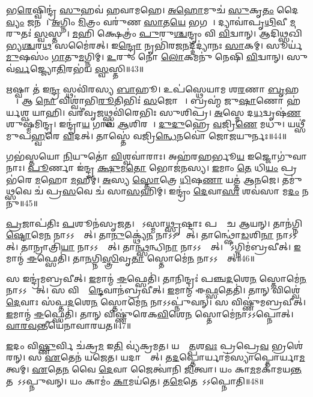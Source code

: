 𑌭\ul{𑌰𑍇}𑌷𑍍𑌵𑌿𑌨𑍍𑌦𑍍𑌰॑ \ul{𑌸𑍁}𑌹𑌵॑ 𑌹𑌵𑌾𑌮𑌹𑍇।
\ul{𑌅}\ul{}\ul{𑌹𑍋}𑌮𑍁𑌚॑ \ul{𑌸𑍁}𑌕𑍃\ul{𑌤𑌂} 𑌦𑍈\ul{𑌵𑍍𑌯𑌂} 𑌜𑌨𑌮𑍍᳚।
\ul{𑌅}𑌗𑍍𑌨𑌿𑌂 \ul{𑌮𑌿}𑌤𑍍𑌰𑌂 𑌵𑌰𑍁॑𑌣 \ul{𑌸𑌾}𑌤\ul{𑌯𑍇} 𑌭𑌗𑌮𑍍᳚।
𑌦𑍍𑌯𑌾𑌵𑌾॑𑌪𑍃\ul{𑌥𑌿}𑌵𑍀 \ul{𑌮}𑌰𑍁𑌤𑌃॑ \ul{𑌸𑍍𑌵}𑌸𑍍𑌤𑌯𑍇᳚।
\ul{𑌮}𑌹𑌿 𑌕𑍍𑌷𑍇𑌤𑍍𑌰𑌂॑ \ul{𑌪𑍁}𑌰𑍁\ul{𑌶𑍍𑌚}𑌨𑍍𑌦𑍍𑌰𑌂 𑌵𑌿 \ul{𑌵𑌿}𑌦𑍍𑌵𑌾𑌨𑍍।
𑌆𑌦𑌿𑌥𑍍𑌸𑌖𑌿॑𑌭𑍍𑌯\ul{𑌶𑍍𑌚}𑌰\ul{𑌥}\ul{} 𑌸𑌮𑍈॑𑌰𑌤𑍍।
𑌇\ul{𑌨𑍍𑌦𑍍𑌰𑍋} 𑌨𑍃𑌭𑌿॑𑌰𑌜\ul{𑌨}𑌦𑍍𑌦𑍀𑌦𑍍𑌯𑌾॑𑌨𑌃 \ul{𑌸𑌾}𑌕𑌮𑍍।
𑌸𑍂𑌰𑍍𑌯॑\ul{𑌮𑍁}𑌷𑌸𑌂॑ \ul{𑌗𑌾}𑌤𑍁\ul{𑌮}𑌗𑍍𑌨𑌿𑌮𑍍।
\ul{𑌉}𑌰𑍁𑌂 𑌨𑍋॑ \ul{𑌲𑍋}𑌕𑌮𑌨𑍁॑ 𑌨𑍇𑌷𑌿 \ul{𑌵𑌿}𑌦𑍍𑌵𑌾𑌨𑍍।
𑌸𑍁𑌵॑\ul{𑌰𑍍𑌵}𑌜𑍍𑌜𑍍𑌯𑍋\ul{𑌤𑌿}𑌰𑌭॑𑌯 \ul{𑌸𑍍𑌵}𑌸𑍍𑌤𑌿॥43॥

\ul{𑌋}𑌷𑍍𑌵𑌾 𑌤॑ 𑌇\ul{𑌨𑍍𑌦𑍍𑌰} 𑌸𑍍𑌥𑌵𑌿॑𑌰𑌸𑍍𑌯 \ul{𑌬𑌾}𑌹𑍂।
𑌉𑌪॑𑌸𑍍𑌥𑍇𑌯𑌾𑌮 𑌶\ul{𑌰}𑌣𑌾 \ul{𑌬𑍃}𑌹𑌨𑍍𑌤𑌾᳚।
𑌆 \ul{𑌨𑍋} 𑌵𑌿𑌶𑍍𑌵𑌾॑𑌭𑌿\ul{𑌰𑍂}𑌤𑌿𑌭𑌿𑌃॑ \ul{𑌸}𑌜𑍋𑌷𑌾𑌃᳚।
𑌬𑍍𑌰𑌹𑍍𑌮॑ 𑌜𑍁\ul{𑌷𑌾}𑌣𑍋 𑌹॑𑌰𑍍𑌯𑌶𑍍𑌵 𑌯𑌾𑌹𑌿।
𑌵𑌰𑍀॑𑌵𑍃\ul{𑌜}𑌥𑍍𑌸𑍍𑌥𑌵𑌿॑𑌰𑍇𑌭𑌿𑌃 𑌸𑍁𑌶𑌿𑌪𑍍𑌰।
\ul{𑌅}𑌸𑍍𑌮𑍇 𑌦\ul{𑌧}𑌦𑍍𑌵𑍃𑌷॑\ul{𑌣}\ul{} 𑌶𑍁𑌷𑍍𑌮॑𑌮𑌿𑌨𑍍𑌦𑍍𑌰।
𑌇𑌨𑍍𑌦𑍍𑌰𑌾॑\ul{𑌯} 𑌗𑌾𑌵॑ \ul{𑌆}𑌶𑌿𑌰𑌮𑍍᳚।
\ul{𑌦𑍁}\ul{𑌦𑍁}𑌹𑍍𑌰𑍇 \ul{𑌵}𑌜𑍍𑌰𑌿\ul{𑌣𑍇} 𑌮𑌧𑍁॑।
𑌯𑌥𑍍𑌸𑍀॑𑌮𑍁𑌪\ul{𑌹𑍍𑌵}𑌰𑍇 \ul{𑌵𑌿}𑌦𑌤𑍍।
𑌤𑌾𑌸𑍍𑌤𑍇॑ 𑌵𑌜𑍍𑌰𑌿\ul{𑌨𑍍𑌧𑍇}𑌨𑌵𑍋॑ 𑌜𑍋𑌜𑌯𑍁𑌰𑍍𑌨𑌃॥44॥

𑌗𑌭॑𑌸𑍍𑌤𑌯𑍋 \ul{𑌨𑌿}𑌯𑍁𑌤𑍋॑ \ul{𑌵𑌿}𑌶𑍍𑌵𑌵𑌾॑𑌰𑌾𑌃।
𑌅𑌹॑𑌰\ul{𑌹}𑌰𑍍𑌭𑍂\ul{𑌯} 𑌇𑌜𑍍𑌜𑍋𑌗𑍁॑𑌵𑌾𑌨𑌾𑌃।
\ul{𑌪𑍂}𑌰𑍍𑌣𑌾 𑌇॑𑌨𑍍𑌦𑍍𑌰 \ul{𑌕𑍍𑌷𑍁}𑌮\ul{𑌤𑍋} 𑌭𑍋𑌜॑𑌨𑌸𑍍𑌯।
\ul{𑌇}𑌮𑌾𑌂 \ul{𑌤𑍇} 𑌧𑌿\ul{𑌯𑌂} 𑌪𑍍𑌰 𑌭॑𑌰𑍇 \ul{𑌮}𑌹𑍋 \ul{𑌮}𑌹𑍀𑌮𑍍।
\ul{𑌅}𑌸𑍍𑌯 \ul{𑌸𑍍𑌤𑍋}𑌤𑍍𑌰𑍇 \ul{𑌧𑌿}𑌷\ul{𑌣𑌾} 𑌯𑌤𑍍𑌤॑ 𑌆\ul{𑌨}𑌜𑍇।
𑌤𑌮𑍁॑\ul{𑌥𑍍𑌸}𑌵𑍇 𑌚॑ 𑌪𑍍𑌰\ul{𑌸}𑌵𑍇 𑌚॑ 𑌸𑌾\ul{𑌸}𑌹𑌿𑌮𑍍।
𑌇𑌨𑍍𑌦𑍍𑌰𑌂॑ \ul{𑌦𑍇}𑌵𑌾\ul{𑌸𑌃} 𑌶𑌵॑𑌸𑌾 𑌮\ul{𑌦𑌂} 𑌨𑌨𑍁॑॥45॥\anuvakamend[\ul{𑌵}𑌜𑍍𑌰𑌿𑌣॑𑌮𑌯\ul{𑌥𑍍𑌸𑍍𑌵}𑌸𑍍𑌤𑌿 𑌜𑍋॑𑌜𑌯𑍁𑌰𑍍𑌨𑌃 \ul{𑌸}𑌪𑍍𑌤 𑌚॑]

\ul{𑌪𑍍𑌰}𑌜𑌾𑌪॑𑌤𑌿𑌃 \ul{𑌪}𑌶𑍂𑌨॑𑌸𑍃𑌜𑌤।
𑌤𑍇᳚𑌽𑌸𑍍𑌮𑌾\ul{𑌥𑍍𑌸𑍃}𑌷𑍍𑌟𑌾𑌃 𑌪𑌰𑌾𑌂᳚ 𑌚 𑌆𑌯𑌨𑍍।
𑌤𑌾𑌨॑𑌗𑍍𑌨𑌿\ul{𑌷𑍍𑌟𑍋}𑌮𑍇\ul{𑌨} 𑌨𑌾𑌽𑌽𑌪𑍍𑌨𑍋᳚𑌤𑍍।
𑌤𑌾\ul{𑌨𑍁}𑌕𑍍𑌥𑍍𑌯𑍇॑\ul{𑌨} 𑌨𑌾𑌽𑌽𑌪𑍍𑌨𑍋᳚𑌤𑍍।
𑌤𑌾𑌨𑍍𑌥𑍍𑌷𑍋॑\ul{𑌡}𑌶𑌿\ul{𑌨𑌾} 𑌨𑌾𑌽𑌽𑌪𑍍𑌨𑍋᳚𑌤𑍍।
𑌤𑌾𑌨𑍍𑌰𑌾𑌤𑍍𑌰𑌿॑\ul{𑌯𑌾} 𑌨𑌾𑌽𑌽𑌪𑍍𑌨𑍋᳚𑌤𑍍।
𑌤𑌾\ul{𑌨𑍍𑌥𑍍𑌸}𑌨𑍍𑌧𑌿\ul{𑌨𑌾} 𑌨𑌾𑌽𑌽𑌪𑍍𑌨𑍋᳚𑌤𑍍।
𑌸𑍋᳚𑌽𑌗𑍍𑌨𑌿𑌮॑𑌬𑍍𑌰𑌵𑍀𑌤𑍍।
\ul{𑌇}𑌮𑌾𑌨𑍍𑌮॑ \ul{𑌈}𑌫𑍍𑌸𑍇𑌤𑌿॑।
𑌤𑌾\ul{𑌨}𑌗𑍍𑌨𑌿\ul{𑌸𑍍𑌤𑍍𑌰𑌿}𑌵𑍃\ul{𑌤𑌾} 𑌸𑍍𑌤𑍋𑌮𑍇॑\ul{𑌨} 𑌨𑌾𑌽𑌽𑌪𑍍𑌨𑍋᳚𑌤𑍍॥46॥

𑌸 𑌇𑌨𑍍𑌦𑍍𑌰॑𑌮𑌬𑍍𑌰𑌵𑍀𑌤𑍍।
\ul{𑌇}𑌮𑌾𑌨𑍍𑌮॑ \ul{𑌈}𑌫𑍍𑌸𑍇𑌤𑌿॑।
𑌤𑌾𑌨𑌿𑌨𑍍𑌦𑍍𑌰𑌃॑ 𑌪𑌞𑍍𑌚\ul{𑌦}𑌶𑍇\ul{𑌨} 𑌸𑍍𑌤𑍋𑌮𑍇॑\ul{𑌨} 𑌨𑌾𑌽𑌽𑌪𑍍𑌨𑍋᳚𑌤𑍍।
𑌸 𑌵𑌿𑌶𑍍𑌵𑌾᳚\ul{𑌨𑍍𑌦𑍇}𑌵𑌾𑌨॑𑌬𑍍𑌰𑌵𑍀𑌤𑍍।
\ul{𑌇}𑌮𑌾𑌨𑍍𑌮॑ 𑌈\ul{𑌫𑍍𑌸}𑌤𑍇𑌤𑌿॑।
𑌤𑌾𑌨𑍍 𑌵𑌿𑌶𑍍𑌵𑍇॑\ul{𑌦𑍇}𑌵𑌾𑌃 𑌸॑𑌪𑍍𑌤\ul{𑌦}𑌶𑍇\ul{𑌨} 𑌸𑍍𑌤𑍋𑌮𑍇॑\ul{𑌨} 𑌨𑌾𑌽𑌽𑌪𑍍𑌨𑍁॑𑌵𑌨𑍍।
𑌸 𑌵𑌿𑌷𑍍𑌣𑍁॑𑌮𑌬𑍍𑌰𑌵𑍀𑌤𑍍।
\ul{𑌇}𑌮𑌾𑌨𑍍𑌮॑ \ul{𑌈}𑌫𑍍𑌸𑍇𑌤𑌿॑।
𑌤𑌾𑌨𑍍 𑌵𑌿𑌷𑍍𑌣𑍁॑𑌰𑍇𑌕\ul{𑌵𑌿}\ul{}𑌶𑍇\ul{𑌨} 𑌸𑍍𑌤𑍋𑌮𑍇॑𑌨𑌾𑌽𑌽𑌪𑍍𑌨𑍋𑌤𑍍।
\ul{𑌵𑌾}\ul{𑌰}\ul{𑌵}𑌨𑍍𑌤𑍀𑌯𑍇॑𑌨𑌾𑌵𑌾𑌰𑌯𑌤॥47॥

\ul{𑌇}𑌦𑌂 𑌵𑌿\ul{𑌷𑍍𑌣𑍁}𑌰𑍍𑌵𑌿 𑌚॑𑌕𑍍𑌰\ul{𑌮} 𑌇\ul{𑌤𑌿} 𑌵𑍍𑌯॑𑌕𑍍𑌰𑌮𑌤।
𑌯𑌸𑍍𑌮𑌾᳚\ul{𑌤𑍍𑌪}𑌶\ul{𑌵𑌃} 𑌪𑍍𑌰𑌪𑍍𑌰𑍇\ul{𑌵} 𑌭𑍍𑌰𑌶𑍇॑𑌰𑌨𑍍।
𑌸 \ul{𑌏}𑌤𑍇𑌨॑ 𑌯𑌜𑍇𑌤।
𑌯𑌦𑌾𑌪𑍍𑌨𑍋᳚𑌤𑍍।
𑌤\ul{𑌦}𑌪𑍍𑌤𑍋𑌰𑍍𑌯𑌾𑌮॑𑌸𑍍𑌯𑌾𑌪𑍍𑌤𑍋𑌰𑍍𑌯𑌾\ul{𑌮}\-𑌤𑍍𑌵𑌮𑍍।
\ul{𑌏}𑌤𑍇\ul{𑌨} 𑌵𑍈 \ul{𑌦𑍇}𑌵𑌾 𑌜𑍈𑌤𑍍𑌵𑌾॑𑌨𑌿 \ul{𑌜𑌿}𑌤𑍍𑌵𑌾।
𑌯𑌂 𑌕𑌾\ul{𑌮}𑌮𑌕𑌾॑𑌮𑌯\ul{𑌨𑍍𑌤} 𑌤𑌮𑌾᳚𑌽𑌽𑌪𑍍𑌨𑍁𑌵𑌨𑍍।
𑌯𑌂 𑌕𑌾𑌮𑌂॑ \ul{𑌕𑌾}𑌮𑌯॑𑌤𑍇।
𑌤\ul{𑌮𑍇}𑌤𑍇𑌨𑌾᳚𑌽𑌽𑌪𑍍𑌨𑍋𑌤𑌿॥48॥\anuvakamend[𑌸𑍍𑌤𑍋𑌮𑍇॑\ul{𑌨} 𑌨𑌾𑌽𑌽𑌪𑍍𑌨𑍋॑𑌦𑌵𑌾𑌰𑌯\ul{𑌤} 𑌨𑌵॑ 𑌚]

